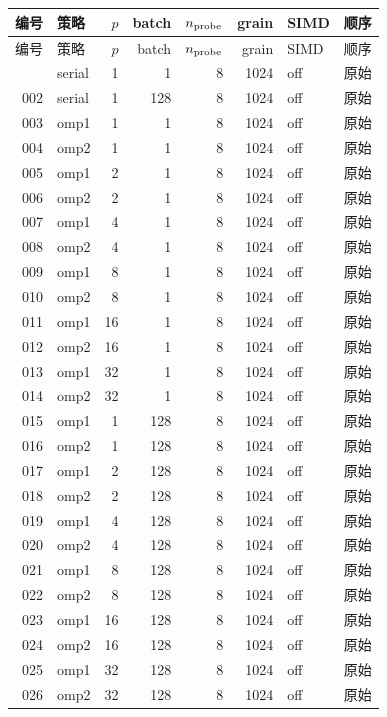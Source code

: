 \begingroup\fontsize{9.3}{11.8}\selectfont
\setlength{\tabcolsep}{4pt}
\begin{longtable}{rlrrrrll}
\toprule
编号 & 策略 & $p$ & batch & $n_{\rm probe}$ & grain & SIMD & 顺序\\\midrule\endfirsthead
\toprule
编号 & 策略 & $p$ & batch & $n_{\rm probe}$ & grain & SIMD & 顺序\\\midrule\endhead
\bottomrule\endfoot
001 & serial & 1 & 1 & 8 & 1024 & off & 原始\\
002 & serial & 1 & 128 & 8 & 1024 & off & 原始\\
003 & omp1 & 1 & 1 & 8 & 1024 & off & 原始\\
004 & omp2 & 1 & 1 & 8 & 1024 & off & 原始\\
005 & omp1 & 2 & 1 & 8 & 1024 & off & 原始\\
006 & omp2 & 2 & 1 & 8 & 1024 & off & 原始\\
007 & omp1 & 4 & 1 & 8 & 1024 & off & 原始\\
008 & omp2 & 4 & 1 & 8 & 1024 & off & 原始\\
009 & omp1 & 8 & 1 & 8 & 1024 & off & 原始\\
010 & omp2 & 8 & 1 & 8 & 1024 & off & 原始\\
011 & omp1 & 16 & 1 & 8 & 1024 & off & 原始\\
012 & omp2 & 16 & 1 & 8 & 1024 & off & 原始\\
013 & omp1 & 32 & 1 & 8 & 1024 & off & 原始\\
014 & omp2 & 32 & 1 & 8 & 1024 & off & 原始\\
015 & omp1 & 1 & 128 & 8 & 1024 & off & 原始\\
016 & omp2 & 1 & 128 & 8 & 1024 & off & 原始\\
017 & omp1 & 2 & 128 & 8 & 1024 & off & 原始\\
018 & omp2 & 2 & 128 & 8 & 1024 & off & 原始\\
019 & omp1 & 4 & 128 & 8 & 1024 & off & 原始\\
020 & omp2 & 4 & 128 & 8 & 1024 & off & 原始\\
021 & omp1 & 8 & 128 & 8 & 1024 & off & 原始\\
022 & omp2 & 8 & 128 & 8 & 1024 & off & 原始\\
023 & omp1 & 16 & 128 & 8 & 1024 & off & 原始\\
024 & omp2 & 16 & 128 & 8 & 1024 & off & 原始\\
025 & omp1 & 32 & 128 & 8 & 1024 & off & 原始\\
026 & omp2 & 32 & 128 & 8 & 1024 & off & 原始\\

\end{longtable}
